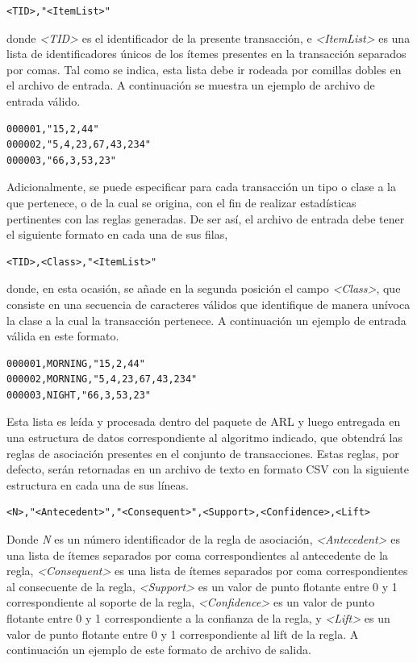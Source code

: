 \begin{lstlisting}[basicstyle=\ttfamily]
<TID>,"<ItemList>"
\end{lstlisting}

donde \textit{<TID>} es el identificador de la presente transacción, e \textit{<ItemList>} es una lista de identificadores únicos de los ítemes presentes en la transacción separados por comas. Tal como se indica, esta lista debe ir rodeada por comillas dobles en el archivo de entrada. A continuación se muestra un ejemplo de archivo de entrada válido.

\begin{lstlisting}[basicstyle=\ttfamily]
000001,"15,2,44"
000002,"5,4,23,67,43,234"
000003,"66,3,53,23"
\end{lstlisting}

Adicionalmente, se puede especificar para cada transacción un tipo o clase a la que pertenece, o de la cual se origina, con el fin de realizar estadísticas pertinentes con las reglas generadas. De ser así, el archivo de entrada debe tener el siguiente formato en cada una de sus filas,

\begin{lstlisting}[basicstyle=\ttfamily]
<TID>,<Class>,"<ItemList>"
\end{lstlisting}

donde, en esta ocasión, se añade en la segunda posición el campo \textit{<Class>}, que consiste en una secuencia de caracteres válidos que identifique de manera unívoca la clase a la cual la transacción pertenece. A continuación un ejemplo de entrada válida en este formato.

\begin{lstlisting}[basicstyle=\ttfamily]
000001,MORNING,"15,2,44"
000002,MORNING,"5,4,23,67,43,234"
000003,NIGHT,"66,3,53,23"
\end{lstlisting}

Esta lista es leída y procesada dentro del paquete de ARL y luego entregada en una estructura de datos correspondiente al algoritmo indicado, que obtendrá las reglas de asociación presentes en el conjunto de transacciones. Estas reglas, por defecto, serán retornadas en un archivo de texto en formato CSV con la siguiente estructura en cada una de sus líneas.

\begin{lstlisting}[basicstyle=\ttfamily]
<N>,"<Antecedent>","<Consequent>",<Support>,<Confidence>,<Lift>
\end{lstlisting}

Donde \textit{N} es un número identificador de la regla de asociación, \textit{<Antecedent>} es una lista de ítemes separados por coma correspondientes al antecedente de la regla, \textit{<Consequent>} es una lista de ítemes separados por coma correspondientes al consecuente de la regla, \textit{<Support>} es un valor de punto flotante entre 0 y 1 correspondiente al soporte de la regla, \textit{<Confidence>} es un valor de punto flotante entre 0 y 1 correspondiente a la confianza de la regla, y \textit{<Lift>} es un valor de punto flotante entre 0 y 1 correspondiente al lift de la regla. A continuación un ejemplo de este formato de archivo de salida.

